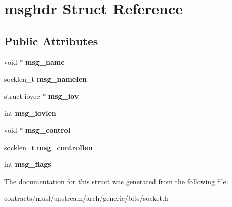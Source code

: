 \hypertarget{structmsghdr}{}\section{msghdr Struct Reference}
\label{structmsghdr}
\subsection*{Public Attributes}
\begin{DoxyCompactItemize}
\item 
\mbox{\label{structmsghdr_a691a8866b21c7083974a2ff1e7987ce1}} 
void $\ast$ {\bfseries msg\+\_\+name}
\item 
\mbox{\label{structmsghdr_a47762b69eee1c9ba5736d64516ea0960}} 
socklen\+\_\+t {\bfseries msg\+\_\+namelen}
\item 
\mbox{\label{structmsghdr_a1b893a6f84c4ba52708c5dcfcc720293}} 
struct iovec $\ast$ {\bfseries msg\+\_\+iov}
\item 
\mbox{\label{structmsghdr_a6c0c0a845c40b73811b0ae0da028b783}} 
int {\bfseries msg\+\_\+iovlen}
\item 
\mbox{\label{structmsghdr_afba5fc31b0f197e25602d2232ca6d783}} 
void $\ast$ {\bfseries msg\+\_\+control}
\item 
\mbox{\label{structmsghdr_ac23c08657b5f48364c658ee1c548936c}} 
socklen\+\_\+t {\bfseries msg\+\_\+controllen}
\item 
\mbox{\label{structmsghdr_a9e8ff97d402c99551cbfd564e9e10a74}} 
int {\bfseries msg\+\_\+flags}
\end{DoxyCompactItemize}


The documentation for this struct was generated from the following file\+:\begin{DoxyCompactItemize}
\item 
contracts/musl/upstream/arch/generic/bits/socket.\+h\end{DoxyCompactItemize}
